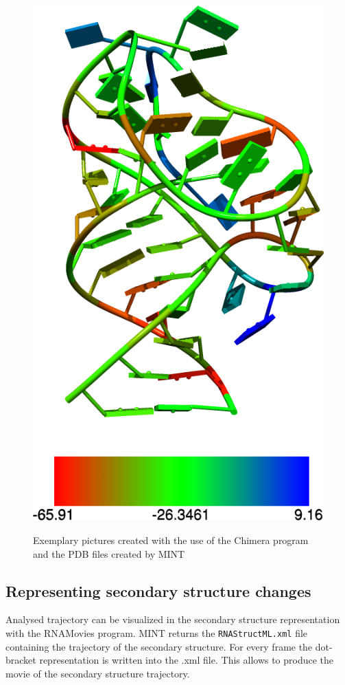 \documentclass[12pt]{article}
\begin{document}
\begin{figure}[!h]
{\includegraphics[scale=0.3]{./pictures/chimera-stacking.png}}
\hspace*{\fill}%
\caption{Exemplary pictures created with the use of the Chimera program and the PDB files created by MINT}
\label{chimera-pictures}
\end{figure}

\newpage
\subsection{Representing secondary structure changes} 
Analysed trajectory can be visualized in the secondary structure representation with the RNAMovies \cite{Evers1999} program. MINT returns the \texttt{RNAStructML.xml} file containing the trajectory of the secondary structure. For every frame the dot-bracket representation is written into the .xml file. This allows to produce the movie of the secondary structure trajectory. 
\end{document}
